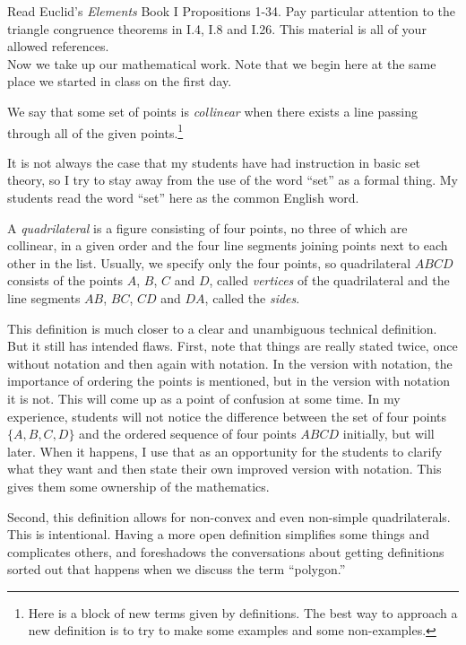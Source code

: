 Read Euclid's \emph{Elements} Book I Propositions 1-34.
Pay particular attention to the triangle congruence theorems in I.4, I.8 and I.26.
This material is all of your allowed references.\\

Now we take up our mathematical work. Note that we begin here at the same place we started in class on the first day.

\begin{definition}\label{defn:collinear}
We say that some set of points is \emph{collinear} when there exists a line passing through all of the given points.\footnote{Here is a block of new terms given by definitions.
The best way to approach a new definition is to try to make some examples and some non-examples.}
\end{definition}

\begin{annotation}
{\color{blue}
It is not always the case that my students have had instruction in basic set theory, so I try to stay away from the use of the word ``set'' as a formal thing. My students read the word ``set'' here as the common English word.
}
\end{annotation}

\begin{definition}\label{defn:quadrilateral}
A \emph{quadrilateral} is a figure consisting of four points, no three of which are collinear, in a given order and the four line segments joining points next to each other in the list.
Usually, we specify only the four points, so quadrilateral $ABCD$ consists of the points $A$, $B$, $C$ and $D$, called \emph{vertices} of the quadrilateral and the line segments $AB$, $BC$, $CD$ and $DA$, called the \emph{sides}.
\end{definition}

\begin{annotation}
{\color{blue}
This definition is much closer to a clear and unambiguous technical definition. But it still has intended flaws. 
First, note that things are really stated twice, once without notation and then again with notation. 
In the version with notation, the importance of ordering the points is mentioned, but in the version with notation it is not. 
This will come up as a point of confusion at some time. 
In my experience, students will not notice the difference between the set of four points $\{A, B, C, D\}$ and the ordered sequence of four points $ABCD$ initially, but will later. 
When it happens, I use that as an opportunity for the students to clarify what they want and then state their own improved version with notation. 
This gives them some ownership of the mathematics.

Second, this definition allows for non-convex and even non-simple quadrilaterals. This is intentional. Having a more open definition simplifies some things and complicates others, and foreshadows the conversations about getting definitions sorted out that happens when we discuss the term ``polygon.''
}
\end{annotation}



